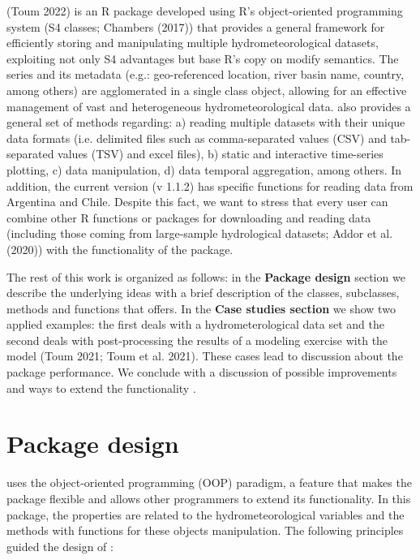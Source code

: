  (Toum 2022) is an R package developed
using R's object-oriented programming system (S4 classes; Chambers (2017)) that
provides a general framework for efficiently storing and manipulating multiple
hydrometeorological datasets, exploiting not only S4 advantages but
base R's copy on modify semantics. The series and its metadata (e.g.:
geo-referenced location, river basin name, country, among others) are
agglomerated in a single class object, allowing for an effective management
of vast and heterogeneous hydrometeorological data.
 also provides a general set of methods regarding: a)
reading multiple datasets with their unique data formats (i.e.
delimited files such as comma-separated values (CSV) and tab-separated
values (TSV) and excel files), b) static and interactive time-series
plotting, c) data manipulation, d) data temporal aggregation, among
others. In addition, the current version (v 1.1.2) has specific
functions for reading data from Argentina and Chile. Despite this fact,
we want to stress that every user can combine other R functions or
packages for downloading and reading data (including those coming from
large-sample hydrological datasets; Addor et al. (2020)) with the
functionality of the package.

The rest of this work is organized as follows:
in the \textbf{Package design} section we
describe the underlying ideas with a brief description of the
classes, subclasses, methods and functions that 
offers. In the \textbf{Case studies section} we show two applied
examples: the first deals with a hydrometerological data set and the second
deals with post-processing the results of a modeling exercise with the
 model (Toum 2021; Toum et al. 2021). These cases
lead to discussion about the package performance. We conclude with a
discussion of possible improvements and ways to extend the functionality
.

\hypertarget{package-design}{%
\section{Package design}\label{package-design}}

 uses the object-oriented programming (OOP) paradigm,
a feature that makes the package flexible and allows other programmers
to extend its functionality. In this package, the properties are related to the
hydrometeorological variables and the methods with functions for
these objects manipulation. The following principles guided the
design of :

